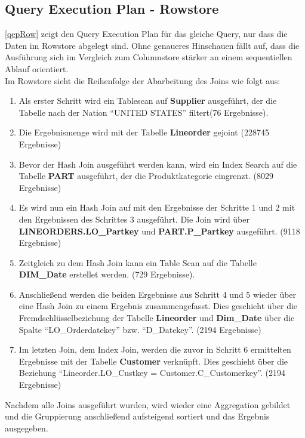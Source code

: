 \subsection{Query Execution Plan - Rowstore}
\autoref{qepRow} zeigt den Query Execution Plan für das gleiche Query, nur dass die Daten im Rowstore abgelegt sind. Ohne genaueres Hinschauen fällt auf, dass die Ausführung sich im Vergleich zum Columnstore stärker an einem sequentiellen Ablauf orientiert.\\ Im Rowstore sieht die Reihenfolge der Abarbeitung des Joins wie folgt aus:
\begin{enumerate}
	\item Als erster Schritt wird ein Tablescan auf \textbf{Supplier} ausgeführt, der die Tabelle nach der Nation \enquote{UNITED STATES} filtert(76 Ergebnisse).
	\item Die Ergebnismenge wird mit der Tabelle \textbf{Lineorder} gejoint (228745 Ergebnisse)
	\item Bevor der Hash Join ausgeführt werden kann, wird ein Index Search auf die Tabelle \textbf{PART} ausgeführt, der die Produktkategorie eingrenzt. (8029 Ergebnisse)
	\item Es wird nun ein Hash Join auf mit den Ergebnisse der Schritte 1 und 2 mit den Ergebnissen des Schrittes 3 ausgeführt. Die Join wird über \textbf{LINEORDERS.LO\_Partkey} und \textbf{PART.P\_Partkey} ausgeführt. (9118 Ergebnisse)
	\item Zeitgleich zu dem Hash Join kann ein Table Scan auf die Tabelle \textbf{DIM\_Date} erstellet werden. (729 Ergebnisse).
	\item Anschließend werden die beiden Ergebnisse aus Schritt 4 und 5 wieder über eine Hash Join zu einem Ergebnis zusammengefasst. Dies geschieht über die Fremdschlüsselbeziehung der Tabelle \textbf{Lineorder} und \textbf{Dim\_Date} über die Spalte \enquote{LO\_Orderdatekey} bzw. \enquote{D\_Datekey}. (2194 Ergebnisse)
	\item Im letzten Join, dem Index Join, werden die zuvor in Schritt 6 ermittelten Ergebnisse mit der Tabelle \textbf{Customer} verknüpft. Dies geschieht über die Beziehung \enquote{Lineorder.LO\_Custkey = Customer.C\_Customerkey}. (2194 Ergebnisse)
\end{enumerate}
Nachdem alle Joins ausgeführt wurden, wird wieder eine Aggregation gebildet und die Gruppierung anschließend aufsteigend sortiert und das Ergebnis ausgegeben.
